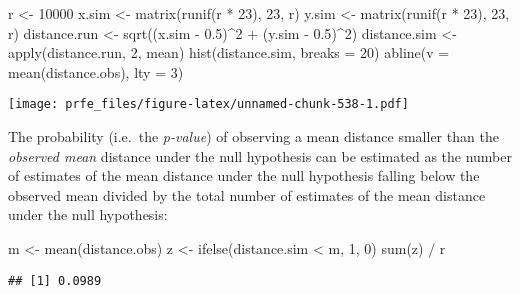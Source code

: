 \documentclass[
  12pt,
  a4paper]{book}
\newenvironment{Shaded}{\begin{snugshade}}{\end{snugshade}}
\newcommand{\AttributeTok}[1]{\textcolor[rgb]{0.77,0.63,0.00}{#1}}
\newcommand{\DecValTok}[1]{\textcolor[rgb]{0.00,0.00,0.81}{#1}}
\newcommand{\FloatTok}[1]{\textcolor[rgb]{0.00,0.00,0.81}{#1}}
\newcommand{\FunctionTok}[1]{\textcolor[rgb]{0.00,0.00,0.00}{#1}}
\newcommand{\NormalTok}[1]{#1}
\newcommand{\OtherTok}[1]{\textcolor[rgb]{0.56,0.35,0.01}{#1}}
\newcommand{\SpecialCharTok}[1]{\textcolor[rgb]{0.00,0.00,0.00}{#1}}
\begin{document}
\begin{Shaded}
\begin{Highlighting}[]
\NormalTok{r }\OtherTok{\textless{}{-}} \DecValTok{10000}
\NormalTok{x.sim }\OtherTok{\textless{}{-}} \FunctionTok{matrix}\NormalTok{(}\FunctionTok{runif}\NormalTok{(r }\SpecialCharTok{*} \DecValTok{23}\NormalTok{), }\DecValTok{23}\NormalTok{, r)}
\NormalTok{y.sim }\OtherTok{\textless{}{-}} \FunctionTok{matrix}\NormalTok{(}\FunctionTok{runif}\NormalTok{(r }\SpecialCharTok{*} \DecValTok{23}\NormalTok{), }\DecValTok{23}\NormalTok{, r)}
\NormalTok{distance.run }\OtherTok{\textless{}{-}} \FunctionTok{sqrt}\NormalTok{((x.sim }\SpecialCharTok{{-}} \FloatTok{0.5}\NormalTok{)}\SpecialCharTok{\^{}}\DecValTok{2} \SpecialCharTok{+}\NormalTok{ (y.sim }\SpecialCharTok{{-}} \FloatTok{0.5}\NormalTok{)}\SpecialCharTok{\^{}}\DecValTok{2}\NormalTok{)}
\NormalTok{distance.sim }\OtherTok{\textless{}{-}} \FunctionTok{apply}\NormalTok{(distance.run, }\DecValTok{2}\NormalTok{, mean)}
\FunctionTok{hist}\NormalTok{(distance.sim, }\AttributeTok{breaks =} \DecValTok{20}\NormalTok{)}
\FunctionTok{abline}\NormalTok{(}\AttributeTok{v =} \FunctionTok{mean}\NormalTok{(distance.obs), }\AttributeTok{lty =} \DecValTok{3}\NormalTok{)}
\end{Highlighting}
\end{Shaded}

\texttt{[image: prfe\_files/figure-latex/unnamed-chunk-538-1.pdf]}

The probability (i.e.~the \emph{p-value}) of observing a mean distance smaller than the \emph{observed mean} distance under the null hypothesis can be estimated as the number of estimates of the mean distance under the null hypothesis falling below the observed mean divided by the total number of estimates of the mean distance under the null hypothesis:

\begin{Shaded}
\begin{Highlighting}[]
\NormalTok{m }\OtherTok{\textless{}{-}} \FunctionTok{mean}\NormalTok{(distance.obs)}
\NormalTok{z }\OtherTok{\textless{}{-}} \FunctionTok{ifelse}\NormalTok{(distance.sim }\SpecialCharTok{\textless{}}\NormalTok{ m, }\DecValTok{1}\NormalTok{, }\DecValTok{0}\NormalTok{)}
\FunctionTok{sum}\NormalTok{(z) }\SpecialCharTok{/}\NormalTok{ r}
\end{Highlighting}
\end{Shaded}

\begin{verbatim}
## [1] 0.0989
\end{verbatim}
\end{document}
